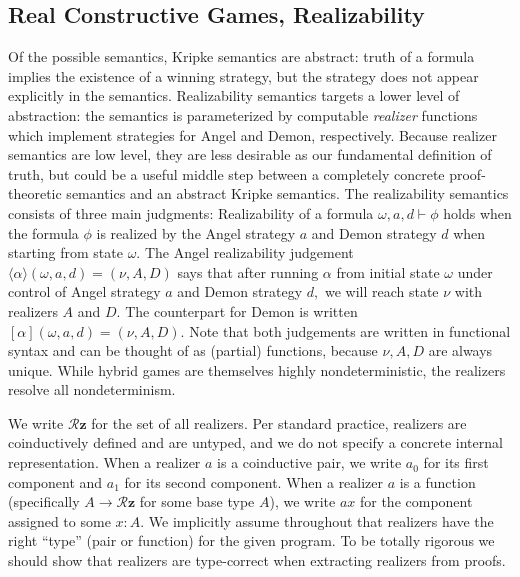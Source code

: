 \documentclass[12pt]{cmuthesis}
\theoremstyle{definition}
\theoremstyle{remark}
\begin{document}
\subsection{Real Constructive Games, Realizability}
\newcommand{\rzF}[2]{#1 \vdash #2}
\newcommand{\rzA}[3]{\langle{#2}\rangle(#1)=(#3)}
\newcommand{\rzD}[3]{[{#2}](#1)=(#3)}
\newcommand{\rzFst}[1]{#1_0}
\newcommand{\rzSnd}[1]{#1_1}
\newcommand{\rzThd}[1]{#1_2}
\newcommand{\rzFrt}[1]{#1_3}
\newcommand{\rzApp}[2]{#1#2}
\newcommand{\sa}{\omega}
\renewcommand{\sb}{\nu}
\newcommand{\Sc}{\mu}
\renewcommand{\aa}{a}
\newcommand{\ab}{A}
\newcommand{\ac}{\aleph}
\newcommand{\da}{d}
\newcommand{\db}{D}
\newcommand{\dc}{\delta}
\newcommand{\allRz}{\mathcal{R}\mathbf{z}}
Of the possible semantics, Kripke semantics are abstract: truth of a formula implies the existence of a winning strategy, but the strategy does not appear explicitly in the semantics.
Realizability semantics targets a lower level of abstraction: the semantics is parameterized by computable \emph{realizer} functions which implement strategies for Angel and Demon, respectively.
Because realizer semantics are low level, they are less desirable as our fundamental definition of truth, but could be a useful middle step between a completely concrete proof-theoretic semantics and an abstract Kripke semantics.
The realizability semantics consists of three main judgments:
Realizability of a formula $\rzF{\sa,\aa,\da}{\phi}$ holds when the formula $\phi$ is realized by the Angel strategy $\aa$ and Demon strategy $\da$ when starting from state $\sa$.
The Angel realizability judgement $\rzA{\sa,\aa,\da}{\alpha}{\sb,\ab,\db}$ says that after running $\alpha$ from initial state $\sa$ under control of Angel strategy $\aa$ and Demon strategy $\da,$ we will reach state $\sb$ with realizers $\ab$ and $\db$.
The counterpart for Demon is written $\rzD{\sa,\aa,\da}{\alpha}{\sb,\ab,\db}$.
Note that both judgements are written in functional syntax and can be thought of as (partial) functions, because $\sb,\ab,\db$ are always unique.
While hybrid games are themselves highly nondeterministic, the realizers resolve all nondeterminism.

We write $\allRz$ for the set of all realizers.
Per standard practice, realizers are coinductively defined and are untyped, and we do not specify a concrete internal representation.
When a realizer $\aa$ is a coinductive pair, we write $\rzFst{\aa}$ for its first component and $\rzSnd{\aa}$ for its second component.
When a realizer $\aa$ is a function (specifically $A \to \allRz$ for some base type $A$), we write $\rzApp{\aa}{x}$ for the component assigned to some $x:A$.
We implicitly assume throughout that realizers have the right ``type'' (pair or function) for the given program.
To be totally rigorous we should show that realizers are type-correct when extracting realizers from proofs.
\end{document}
